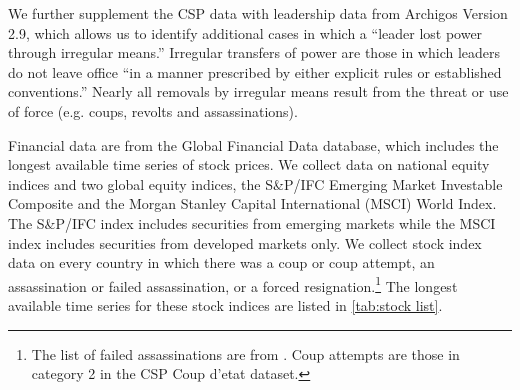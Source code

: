 \documentclass[12pt,final,fleqn]{article}
\theoremstyle{plain}
\begin{document}
We further supplement the CSP data with leadership data from Archigos Version 2.9, which allows us to identify additional cases in which a ``leader lost power through irregular means.'' Irregular transfers of power are those in which leaders do not leave office ``in a manner prescribed by either explicit rules or established conventions.'' Nearly all removals by irregular means result from the threat or use of force (e.g. coups, revolts and assassinations).

Financial data are from the Global Financial Data database, which includes the longest available time series of stock prices. We collect data on national equity indices and two global equity indices, the S\&P/IFC Emerging Market Investable Composite and the Morgan Stanley Capital International (MSCI) World Index. The S\&P/IFC index includes securities from emerging markets while the MSCI index includes securities from developed markets only. We collect stock index data on every country in which there was a coup or coup attempt, an assassination or failed assassination, or a forced resignation.\footnote{The list of failed assassinations are from \citep{jones2009hit}. Coup attempts are those in category 2 in the CSP Coup d'etat dataset.} The longest available time series for these stock indices are listed in \autoref{tab:stock list}.
\end{document}

